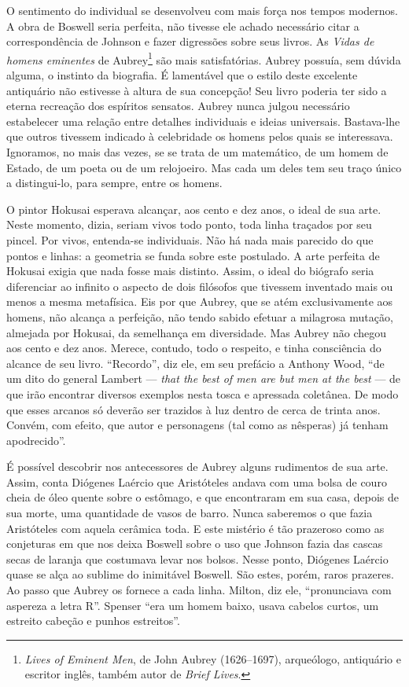 O sentimento do individual se desenvolveu com mais força nos tempos
modernos. A obra de Boswell seria perfeita, não tivesse ele achado
necessário citar a correspondência de Johnson e fazer digressões sobre
seus livros. As \textit{Vidas de homens eminentes} de Aubrey\footnote{
\textit{Lives of Eminent Men}, de John Aubrey (1626--1697), arqueólogo,
antiquário e escritor inglês, também autor de \textit{Brief Lives}.} 
são mais satisfatórias. Aubrey
possuía, sem dúvida alguma, o instinto da biografia. É lamentável que o
estilo deste excelente antiquário não estivesse à altura de sua concepção!
Seu livro poderia ter sido a eterna recreação dos espíritos sensatos.
Aubrey nunca julgou necessário estabelecer uma relação entre detalhes
individuais e ideias universais. Bastava-lhe que outros tivessem indicado
à celebridade os homens pelos quais se interessava. Ignoramos, no mais das
vezes, se se trata de um matemático, de um homem de Estado, de um poeta ou
de um relojoeiro. Mas cada um deles tem seu traço único a distingui-lo,
para sempre, entre os homens.

O pintor Hokusai esperava alcançar, aos cento e dez anos, o ideal
de sua arte. Neste momento, dizia, seriam vivos todo ponto, toda linha
traçados por seu pincel. Por vivos, entenda-se individuais. Não há nada
mais parecido do que pontos e linhas: a geometria se funda sobre este
postulado. A arte perfeita de Hokusai exigia que nada fosse mais distinto.
Assim, o ideal do biógrafo seria diferenciar ao infinito o aspecto de dois
filósofos que tivessem inventado mais ou menos a mesma metafísica. Eis por
que Aubrey, que se atém exclusivamente aos homens, não alcança a
perfeição, não tendo sabido efetuar a milagrosa mutação, almejada por
Hokusai, da semelhança em diversidade. Mas Aubrey não chegou aos cento e
dez anos. Merece, contudo, todo o respeito, e tinha consciência
do alcance de seu livro. “Recordo'', diz ele, em seu prefácio a Anthony
Wood, ``de um dito do general Lambert --- \textit{that the best of men are but men at
the best} --- de que irão encontrar diversos exemplos nesta tosca e
apressada coletânea. De modo que esses arcanos só deverão ser trazidos à
luz dentro de cerca de trinta anos. Convém, com efeito, que autor e
personagens (tal como as nêsperas) já  tenham apodrecido”.

É possível descobrir nos antecessores de Aubrey alguns rudimentos
de sua arte. Assim, conta Diógenes Laércio que Aristóteles andava com uma
bolsa de couro cheia de óleo quente sobre o estômago, e que encontraram em
sua casa, depois de sua morte, uma quantidade de vasos de barro. Nunca
saberemos o que fazia Aristóteles com aquela cerâmica toda. E este
mistério é tão prazeroso como as conjeturas em que nos deixa Boswell sobre
o uso que Johnson fazia das cascas secas de laranja que costumava levar
nos bolsos. Nesse ponto, Diógenes Laércio quase se alça ao sublime do
inimitável Boswell. São estes, porém, raros prazeres. Ao passo que Aubrey
os fornece a cada linha. Milton, diz ele, “pronunciava com aspereza a
letra R”. Spenser “era um homem baixo, usava cabelos curtos, um estreito
cabeção e punhos estreitos”.

